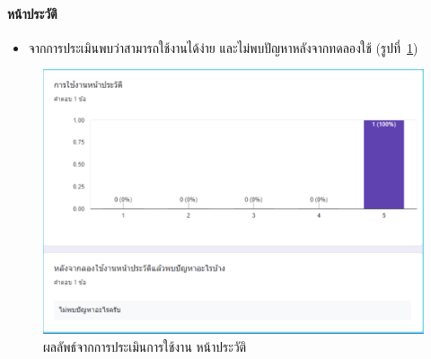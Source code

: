 \paragraph{หน้าประวัติ}
\begin{itemize}
  \item จากการประเมินพบว่าสามารถใช้งานได้ง่าย และไม่พบปัญหาหลังจากทดลองใช้ (รูปที่~\ref{fig:Eval2})
\end{itemize}
\begin{figure}
  \begin{center}
    \includegraphics[width=\linewidth]{images/eval2.png}
  \end{center}
  \caption[ผลลัพธ์จากการประเมินการใช้งาน หน้าประวัติ]{ผลลัพธ์จากการประเมินการใช้งาน หน้าประวัติ}
  \label{fig:Eval2}
\end{figure}

